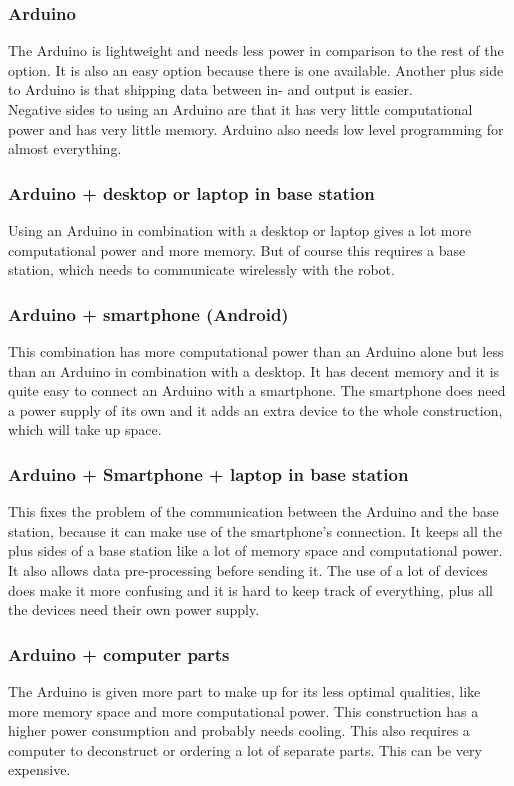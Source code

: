 \documentclass[11pt,twoside,a4paper]{report}
\begin{document}
\subsubsection{Arduino}
The Arduino is lightweight and needs less power in comparison to the rest of the option. It is also an easy option because there is one available. Another plus side to Arduino is that shipping data between in- and output is easier. \\
Negative sides to using an Arduino are that it has very little computational power and has very little memory. Arduino also needs low level programming for almost everything.
\subsubsection{Arduino + desktop or laptop in base station}
Using an Arduino in combination with a desktop or laptop gives a lot more computational power and more memory. But of course this requires a base station, which needs to communicate wirelessly with the robot. 
\subsubsection{Arduino + smartphone (Android)}
This combination has more computational power than an Arduino alone but less than an Arduino in combination with a desktop. It has decent memory and it is quite easy to connect an Arduino with a smartphone. The smartphone does need a power supply of its own and it adds an extra device to the whole construction, which will take up space.
\subsubsection{Arduino + Smartphone + laptop in base station}
This fixes the problem of the communication between the Arduino and the base station, because it can make use of the smartphone’s connection. It keeps all the plus sides of a base station like a lot of memory space and computational power. It also allows data pre-processing before sending it. The use of a lot of devices does make it more confusing and it is hard to keep track of everything, plus all the devices need their own power supply.
\subsubsection{Arduino + computer parts}
The Arduino is given more part to make up for its less optimal qualities, like more memory space and more computational power. This construction has a higher power consumption and probably needs cooling. This also requires a computer to deconstruct or ordering a lot of separate parts. This can be very expensive.
\end{document}
